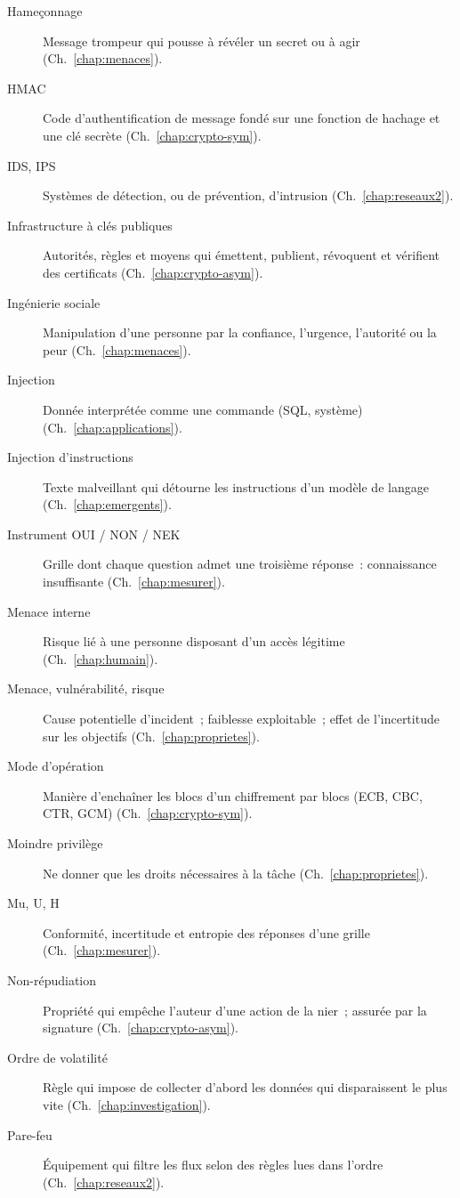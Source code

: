 \begin{description}
    \item[Hameçonnage] Message trompeur qui pousse à révéler un secret ou à agir (Ch.~\ref{chap:menaces}).
    \item[HMAC] Code d'authentification de message fondé sur une fonction de hachage et une clé secrète (Ch.~\ref{chap:crypto-sym}).
    \item[IDS, IPS] Systèmes de détection, ou de prévention, d'intrusion (Ch.~\ref{chap:reseaux2}).
    \item[Infrastructure à clés publiques] Autorités, règles et moyens qui émettent, publient, révoquent et vérifient des certificats (Ch.~\ref{chap:crypto-asym}).
    \item[Ingénierie sociale] Manipulation d'une personne par la confiance, l'urgence, l'autorité ou la peur (Ch.~\ref{chap:menaces}).
    \item[Injection] Donnée interprétée comme une commande (SQL, système) (Ch.~\ref{chap:applications}).
    \item[Injection d'instructions] Texte malveillant qui détourne les instructions d'un modèle de langage (Ch.~\ref{chap:emergents}).
    \item[Instrument OUI / NON / NEK] Grille dont chaque question admet une troisième réponse~: connaissance insuffisante (Ch.~\ref{chap:mesurer}).
    \item[Menace interne] Risque lié à une personne disposant d'un accès légitime (Ch.~\ref{chap:humain}).
    \item[Menace, vulnérabilité, risque] Cause potentielle d'incident~; faiblesse exploitable~; effet de l'incertitude sur les objectifs (Ch.~\ref{chap:proprietes}).
    \item[Mode d'opération] Manière d'enchaîner les blocs d'un chiffrement par blocs (ECB, CBC, CTR, GCM) (Ch.~\ref{chap:crypto-sym}).
    \item[Moindre privilège] Ne donner que les droits nécessaires à la tâche (Ch.~\ref{chap:proprietes}).
    \item[Mu, U, H] Conformité, incertitude et entropie des réponses d'une grille (Ch.~\ref{chap:mesurer}).
    \item[Non-répudiation] Propriété qui empêche l'auteur d'une action de la nier~; assurée par la signature (Ch.~\ref{chap:crypto-asym}).
    \item[Ordre de volatilité] Règle qui impose de collecter d'abord les données qui disparaissent le plus vite (Ch.~\ref{chap:investigation}).
    \item[Pare-feu] Équipement qui filtre les flux selon des règles lues dans l'ordre (Ch.~\ref{chap:reseaux2}).

\end{description}
